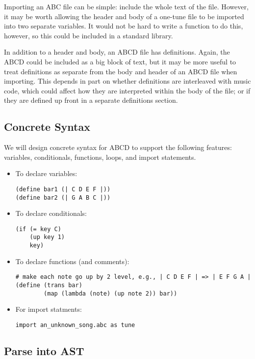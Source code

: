     Importing an ABC file can be simple: include the whole text of the file. However, it may be worth allowing the header and body of a one-tune file to be imported into two separate variables. It would not be hard to write a function to do this, however, so this could be included in a standard library.
    
    In addition to a header and body, an ABCD file has definitions. Again, the ABCD could be included as a big block of text, but it may be more useful to treat definitions as separate from the body and header of an ABCD file when importing. This depends in part on whether definitions are interleaved with music code, which could affect how they are interpreted within the body of the file; or if they are defined up front in a separate definitions section.

\subsection{Concrete Syntax}

We will design concrete syntax for ABCD to support the following features: variables, conditionals, functions, loops, and import statements.

\begin{itemize}
\item To declare variables:
\begin{verbatim}
(define bar1 (| C D E F |))
(define bar2 (| G A B C |))
\end{verbatim}

\item To declare conditionals:
\begin{verbatim}
(if (= key C)
    (up key 1)
    key)
\end{verbatim}

\item To declare functions (and comments):
\begin{verbatim}
# make each note go up by 2 level, e.g., | C D E F | => | E F G A |
(define (trans bar)
        (map (lambda (note) (up note 2)) bar))
\end{verbatim}

\item For import statments:
\begin{verbatim}
import an_unknown_song.abc as tune
\end{verbatim}
\end{itemize}

\subsection{Parse into AST}

